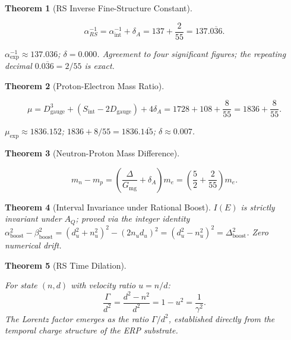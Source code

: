 \documentclass[11pt, letterpaper]{article}
\newcommand{\Tcharge}{\Gamma}
\newcommand{\Dg}{D_{\mathrm{gauge}}}
\newcommand{\Sint}{S_{\mathrm{int}}}
\theoremstyle{definition}
\theoremstyle{plain}
\newtheorem{theorem}{Theorem}[section]
\begin{document}
\begin{theorem}[RS Inverse Fine-Structure Constant]\label{thm:alpha-rs}
\begin{rsbox}
\[
\alpha^{-1}_{RS} = \alpha^{-1}_{\mathrm{int}}+\delta_A
= 137+\frac{2}{55} = 137.\overline{036}.
\]
\end{rsbox}
\begin{verifybox}
$\alpha^{-1}_{\mathrm{exp}}\approx 137.036$; $\delta=0.000$.
Agreement to four significant figures; the repeating decimal
$0.\overline{036}=2/55$ is exact.
\end{verifybox}
\end{theorem}

\begin{theorem}[Proton-Electron Mass Ratio]\label{thm:proton-mass}
\begin{rsbox}
\[
\mu = \Dg^3+(\Sint-2\Dg)+4\delta_A
    = 1728+108+\frac{8}{55}
    = 1836+\frac{8}{55}.
\]
\end{rsbox}
\begin{verifybox}
$\mu_{\mathrm{exp}}\approx 1836.152$;
$1836+8/55=1836.1\overline{45}$; $\delta\approx 0.007$.
\end{verifybox}
\end{theorem}

\begin{theorem}[Neutron-Proton Mass Difference]\label{thm:neutron-proton}
\begin{rsbox}
\[
m_n-m_p = \left(\frac{\Delta}{G_{\mathrm{mg}}}+\delta_A\right)m_e
         = \left(\frac{5}{2}+\frac{2}{55}\right)m_e.
\]
\end{rsbox}
\end{theorem}

\begin{theorem}[Interval Invariance under Rational Boost]
\label{thm:interval-inv}
$I(E)$ is strictly invariant under $A_Q$; proved via the integer identity
$\alpha_{\mathrm{boost}}^2-\beta_{\mathrm{boost}}^2
=(d_u^2+n_u^2)^2-(2n_ud_u)^2=(d_u^2-n_u^2)^2=\Delta_{\mathrm{boost}}^2$.
Zero numerical drift.
\end{theorem}

\begin{theorem}[RS Time Dilation]\label{thm:time-dilation}
\begin{rsbox}
For state $(n,d)$ with velocity ratio $u=n/d$:
\[
\frac{\Tcharge}{d^2} = \frac{d^2-n^2}{d^2} = 1-u^2 = \frac{1}{\gamma^2}.
\]
The Lorentz factor emerges as the ratio $\Tcharge/d^2$, established directly
from the temporal charge structure of the ERP substrate.
\end{rsbox}
\end{theorem}
\end{document}
